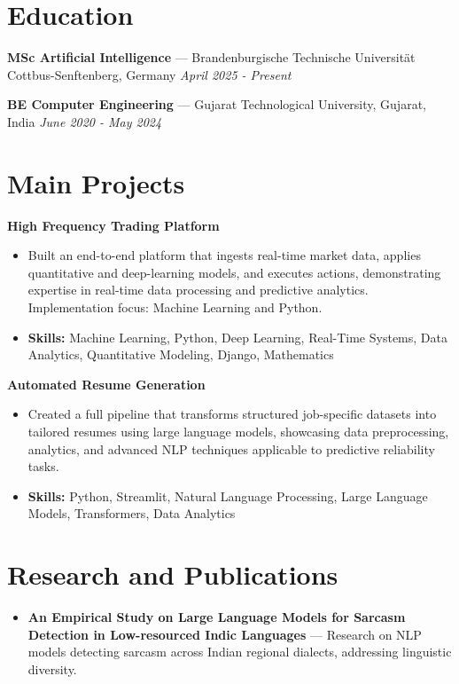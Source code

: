 \documentclass[a4paper,10pt]{article}
\begin{document}
\section*{Education}
\textbf{MSc Artificial Intelligence} — Brandenburgische Technische Universität Cottbus-Senftenberg, Germany \hfill \textit{April 2025 - Present}\par
\vspace{1.5pt}
\textbf{BE Computer Engineering} — Gujarat Technological University, Gujarat, India \hfill \textit{June 2020 - May 2024}\par

\section*{Main Projects}
\textbf{High Frequency Trading Platform}\par
\vspace{1pt}
\begin{itemize}
  \item Built an end-to-end platform that ingests real-time market data, applies quantitative and deep-learning models, and executes actions, demonstrating expertise in real-time data processing and predictive analytics. Implementation focus: Machine Learning and Python.
  \item \textbf{Skills:} Machine Learning, Python, Deep Learning, Real-Time Systems, Data Analytics, Quantitative Modeling, Django, Mathematics
\end{itemize}
\vspace{3pt}
\textbf{Automated Resume Generation}\par
\vspace{1pt}
\begin{itemize}
  \item Created a full pipeline that transforms structured job-specific datasets into tailored resumes using large language models, showcasing data preprocessing, analytics, and advanced NLP techniques applicable to predictive reliability tasks.
  \item \textbf{Skills:} Python, Streamlit, Natural Language Processing, Large Language Models, Transformers, Data Analytics
\end{itemize}

\section*{Research and Publications}
\begin{itemize}
\item \textbf{An Empirical Study on Large Language Models for Sarcasm Detection in Low-resourced Indic Languages} — Research on NLP models detecting sarcasm across Indian regional dialects, addressing linguistic diversity.
\end{itemize}
\end{document}
